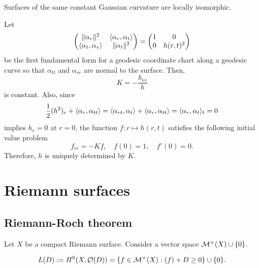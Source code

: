 \documentclass{../../large}
\begin{document}
\begin{prb}
Surfaces of the same constant Gaussian curvature are locally isomorphic.
\end{prb}
\begin{pf}
Let
\[\begin{pmatrix}\|\alpha_r\|^2&\langle\alpha_r,\alpha_t\rangle\\\langle\alpha_t,\alpha_r\rangle&\|\alpha_t\|^2\end{pmatrix}=\begin{pmatrix}1&0\\0&h(r,t)^2\end{pmatrix}\]
be the first fundamental form for a geodesic coordinate chart along a geodesic curve so that $\alpha_{tt}$ and $\alpha_{rr}$ are normal to the surface.
Then,
\[K=-\frac{h_{rr}}h\]
is constant.
Also, since
\[\frac12(h^2)_r+\langle\alpha_r,\alpha_{tt}\rangle=\langle\alpha_{rt},\alpha_t\rangle+\langle\alpha_r,\alpha_{tt}\rangle=\langle\alpha_r,\alpha_t\rangle_t=0\]
implies $h_r=0$ at $r=0$, the function $f:r\mapsto h(r,t)$ satisfies the following initial value problem
\[f_{rr}=-Kf,\quad f(0)=1,\quad f'(0)=0.\]
Therefore, $h$ is uniquely determined by $K$.
\end{pf}



\chapter{}


















\part{Riemann surfaces}

\chapter{Riemann-Roch theorem}

Let $X$ be a compact Riemann surface.
Consider a vector space $\mathcal{M}^\times(X)\cup\{0\}$.

\[L(D):=H^0(X,\mathcal{O}(D))=\{f\in\mathcal{M}^\times(X):(f)+D\ge0\}\cup\{0\}.\]
\end{document}
